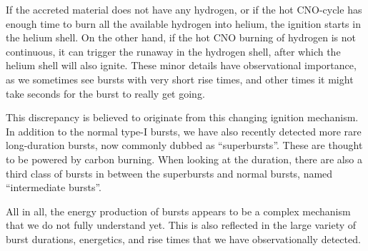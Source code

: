 If the accreted material does not have any hydrogen, or if the hot CNO-cycle has enough time to burn all the available hydrogen into helium, the ignition starts in the helium shell.
On the other hand, if the hot CNO burning of hydrogen is not continuous, it can trigger the runaway in the hydrogen shell, after which the helium shell will also ignite.
These minor details have observational importance, as we sometimes see bursts with very short rise times, and other times it might take seconds for the burst to really get going.%

This discrepancy is believed to originate from this changing ignition mechanism.
In addition to the normal type-I bursts, we have also recently detected more rare long-duration bursts, now commonly dubbed as ``superbursts''.\cite{CHK00, Kuulkers02, SB02}
These are thought to be powered by carbon burning.\cite{Cumming01}
When looking at the duration, there are also a third class of bursts in between the superbursts and normal bursts, named ``intermediate bursts''.\cite{Cumming06}

All in all, the energy production of bursts appears to be a complex mechanism that we do not fully understand yet.\cite{Kuuttila17, intZand17}
This is also reflected in the large variety of burst durations, energetics, and rise times that we have observationally detected.\cite[see e.g.,][]{GMH08}
